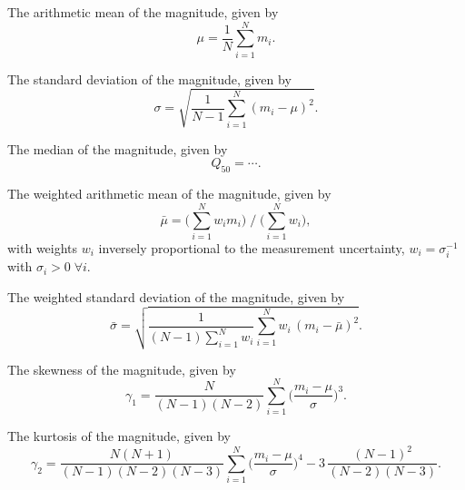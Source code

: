\begin{enumerate}

 The arithmetic mean of the magnitude, given by
\begin{equation}\mu = \frac{1}{N} \sum\limits_{i=1}^{N} m_i.\end{equation}

 The standard deviation of the magnitude, given by
\begin{equation}\sigma = \sqrt{\frac{1}{N-1} \sum_{i=1}^N (m_i - \mu)^2}.\end{equation}

 The median of the magnitude, given by
\begin{equation}Q_{50} = \cdots.\end{equation}

 The weighted arithmetic mean of the magnitude, given by
\begin{equation}\bar \mu = \big(\sum\limits_{i=1}^{N} w_i m_i\big) \; / \; \big(\sum\limits_{i=1}^{N} w_i\big),\end{equation}
with weights $w_i$ inversely proportional to the measurement uncertainty, \ie $w_i = \sigma_i^{-1}$ with $\sigma_i > 0 \; \forall i$.


 The weighted standard deviation of the magnitude, given by
\begin{equation}\bar \sigma = \sqrt{\frac{1}{(N-1) \sum\limits_{i=1}^{N} w_i} \sum_{i=1}^N w_i \, ( m_i - \bar \mu)^2}.\end{equation}

 The skewness of the magnitude, given by
\begin{equation}\gamma_1 = \frac{N}{(N-1)(N-2)} \sum\limits_{i=1}^N \big( \frac{m_i - \mu}{\sigma} \big)^3.\end{equation}

 The kurtosis of the magnitude, given by
\begin{equation}\gamma_2 = \frac{N(N+1)}{(N-1)(N-2)(N-3)} \sum\limits_{i=1}^N \big( \frac{m_i - \mu}{\sigma} \big)^4 - 3 \, \frac{(N-1)^2}{(N-2)(N-3)}.\end{equation}


\end{enumerate}
